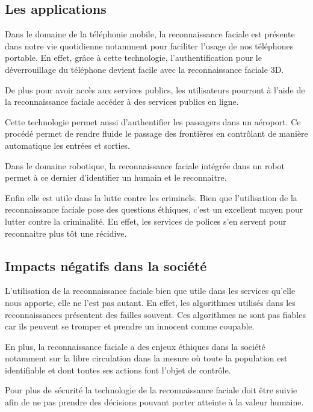 \documentclass[12pt, letterpaper]{article}
\begin{document}
\subsection{Les applications}
\par Dans le domaine de la téléphonie mobile, la reconnaissance faciale est présente dans notre vie quotidienne notamment pour faciliter l’usage de nos téléphones portable. En effet, grâce à cette technologie, l’authentification pour le déverrouillage du téléphone devient facile avec la reconnaissance faciale 3D.\\
\par De plus pour avoir accès aux services publics, les utilisateurs pourront à l’aide de la reconnaissance faciale accéder à des services publics en ligne.\\
\par Cette technologie permet aussi d'authentifier les passagers dans un aéroport. Ce procédé permet de rendre fluide le passage des frontières en contrôlant de manière automatique les entrées et sorties.\\
\par Dans le domaine robotique, la reconnaissance faciale intégrée dans un robot permet à ce dernier d’identifier un humain et le reconnaitre.\\
\par Enfin elle est utile dans la lutte contre les criminels. Bien que l’utilisation de la reconnaissance faciale pose des questions éthiques, c’est un excellent moyen pour lutter contre la criminalité.  En effet, les services de polices s’en servent pour reconnaitre plus tôt une récidive.

\subsection{Impacts négatifs dans la société}
L’utilisation de la reconnaissance faciale bien que utile dans les services qu’elle nous apporte, elle ne l’est pas autant. En effet, les algorithmes utilisés dans les reconnaissances présentent des failles souvent. Ces algorithmes ne sont pas fiables car ils peuvent se tromper et prendre un innocent comme coupable.\\
\par En plus, la reconnaissance faciale a des enjeux éthiques dans la société notamment sur la libre circulation dans la mesure où toute la population est identifiable et dont toutes ses actions font l’objet de contrôle.\\
\par Pour plus de sécurité la technologie de la reconnaissance faciale doit être suivie afin de ne pas prendre des décisions pouvant porter atteinte à la valeur humaine. 
\end{document}
